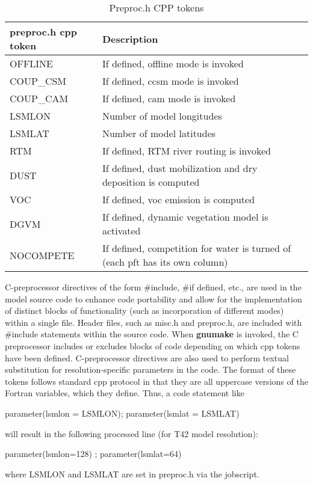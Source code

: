 \medskip
\begin{longtable}{|p{1.5in}|p{4.5in}|}
\caption{\label{preproc.h} Preproc.h CPP tokens} \\
\hline
\endhead
\hline
{\bf preproc.h cpp token}  & {\bf Description}  \\ \hline
 OFFLINE        & If defined, offline mode is invoked \\ \hline
 COUP\_CSM      & If defined, ccsm mode is invoked \\ \hline
 COUP\_CAM      & If defined, cam mode is invoked \\ \hline
 LSMLON         & Number of model longitudes  \\ \hline
 LSMLAT         & Number of model latitudes \\ \hline
 RTM            & If defined, RTM river routing is invoked \\ \hline
 DUST           & If defined, dust mobilization and dry deposition is computed \\ \hline
 VOC            & If defined, voc emission is computed \\ \hline
 DGVM           & If defined, dynamic vegetation model is activated \\ \hline
 NOCOMPETE      & If defined, competition for water is turned of (each pft has its own column) \\ \hline
\end{longtable}
\medskip

C-preprocessor directives of the form \#include, \#if defined, etc.,
are used in the model source code to enhance code portability and
allow for the implementation of distinct blocks of functionality (such
as incorporation of different modes) within a single file.  Header
files, such as misc.h and preproc.h, are included with \#include
statements within the source code. When {\bf gnumake} is invoked, the
C preprocessor includes or excludes blocks of code depending on which
cpp tokens have been defined. C-preprocessor directives are also used
to perform textual substitution for resolution-specific parameters in
the code. The format of these tokens follows standard cpp protocol in
that they are all uppercase versions of the Fortran variables, which
they define. Thus, a code statement like
\begin{description}
\item [parameter(lsmlon = LSMLON); parameter(lsmlat = LSMLAT)] 
\end{description}
will result in the following processed line (for T42 model resolution):
\begin{description}
\item[parameter(lsmlon=128) ; parameter(lsmlat=64)] 
\end{description}
where LSMLON and LSMLAT are set in preproc.h via the jobscript. \\

